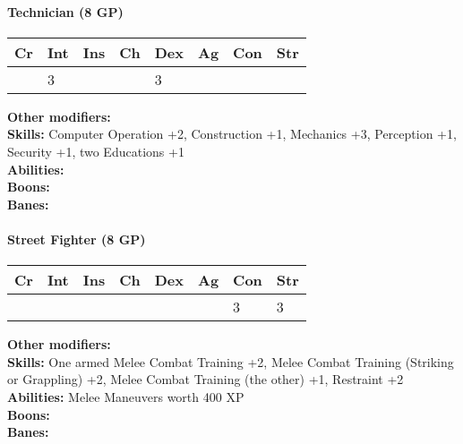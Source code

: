 \hrulefill
\paragraph*{Technician (8 GP)}
\textit{}\par
\begin{tabular}{|l|l|l|l|l|l|l|l|}
	\hline
	Cr & Int & Ins & Ch & Dex & Ag & Con & Str \\ \hline
	& 3 &  &  & 3 &  &  &  \\ \hline
\end{tabular}\par
\noindent\textbf{Other modifiers:} \\
\textbf{Skills:} Computer Operation +2,
Construction +1,
Mechanics +3,
Perception +1,
Security +1,
two Educations +1\\
\textbf{Abilities:} \\
\textbf{Boons:} \\
\textbf{Banes:} \\

\hrulefill
\paragraph*{Street Fighter (8 GP)}
\textit{}\par
\begin{tabular}{|l|l|l|l|l|l|l|l|}
	\hline
	Cr & Int & Ins & Ch & Dex & Ag & Con & Str \\ \hline
	&  &  &  &  &  & 3 & 3 \\ \hline
\end{tabular}\par
\noindent\textbf{Other modifiers:} \\
\textbf{Skills:} One armed Melee Combat Training +2,
Melee Combat Training (Striking or Grappling) +2,
Melee Combat Training (the other) +1,
Restraint +2\\
\textbf{Abilities:} Melee Maneuvers worth 400 XP\\
\textbf{Boons:} \\
\textbf{Banes:} \\
